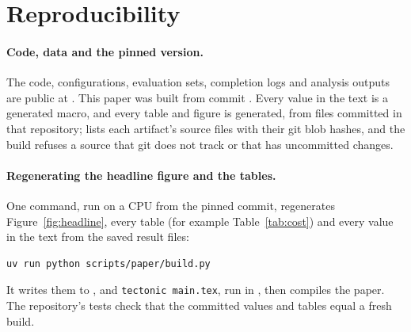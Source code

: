 \section{Reproducibility}
\label{app:repro}

\paragraph{Code, data and the pinned version.}
The code, configurations, evaluation sets, completion logs and analysis outputs are public at .
This paper was built from commit .
Every value in the text is a generated macro, and every table and figure is generated, from files committed in that
repository;  lists each artifact's source files with their git blob hashes, and the
build refuses a source that git does not track or that has uncommitted changes.

\paragraph{Regenerating the headline figure and the tables.}
One command, run on a CPU from the pinned commit, regenerates Figure~\ref{fig:headline}, every table (for example
Table~\ref{tab:cost}) and every value in the text from the saved result files:
\begin{verbatim}
uv run python scripts/paper/build.py
\end{verbatim}
It writes them to , and \texttt{tectonic main.tex}, run in , then compiles the
paper.
The repository's tests check that the committed values and tables equal a fresh build.

